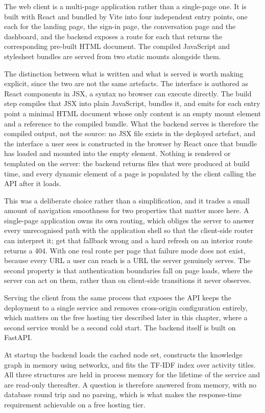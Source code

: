 The web client is a multi-page application rather than a single-page one. It is built with
React\citep{react_docs} and bundled by Vite\citep{vite_docs} into four independent entry
points, one each for the landing page, the sign-in page, the conversation page and the
dashboard, and the backend exposes a route for each that returns the corresponding
pre-built HTML document. The compiled JavaScript and stylesheet bundles are served from
two static mounts alongside them.

The distinction between what is written and what is served is worth making explicit, since
the two are not the same artefacts. The interface is authored as React components in JSX,
a syntax no browser can execute directly. The build step compiles that JSX into plain
JavaScript, bundles it, and emits for each entry point a minimal HTML document whose only
content is an empty mount element and a reference to the compiled bundle. What the backend
serves is therefore the compiled output, not the source: no JSX file exists in the deployed
artefact, and the interface a user sees is constructed in the browser by React once that
bundle has loaded and mounted into the empty element. Nothing is rendered or templated on the server: the
backend returns files that were produced at build time, and every dynamic element of a
page is populated by the client calling the API after it loads.

This was a deliberate choice rather than a simplification, and it trades a small amount of
navigation smoothness for two properties that matter more here. A single-page application
owns its own routing, which obliges the server to answer every unrecognised path with the
application shell so that the client-side router can interpret it; get that fallback wrong
and a hard refresh on an interior route returns a 404. With one real route per page that
failure mode does not exist, because every URL a user can reach is a URL the server
genuinely serves. The second property is that authentication boundaries fall on page
loads, where the server can act on them, rather than on client-side transitions it never
observes.

Serving the client from the same process that exposes the API keeps the deployment to a
single service and removes cross-origin configuration entirely, which matters on the free
hosting tier described later in this chapter, where a second service would be a second
cold start. The backend itself is built on FastAPI\citep{fastapi_docs}.

At startup the backend loads the cached node set, constructs the knowledge graph in
memory using networkx\citep{hagberg2008networkx}, and fits the TF-IDF index over activity
titles. All three structures are held in process memory for the lifetime of the service
and are read-only thereafter. A question is therefore answered from memory, with no
database round trip and no parsing, which is what makes the response-time requirement
achievable on a free hosting tier.

